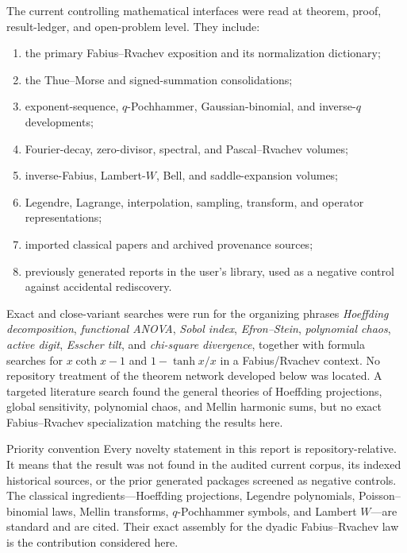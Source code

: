 \documentclass[11pt,oneside]{article}
\theoremstyle{definition}
\theoremstyle{remark}
\begin{document}
The current controlling mathematical interfaces were read at theorem,
proof, result-ledger, and open-problem level.  They include:
\begin{enumerate}
\item the primary Fabius--Rvachev exposition and its normalization dictionary;
\item the Thue--Morse and signed-summation consolidations;
\item exponent-sequence, $q$-Pochhammer, Gaussian-binomial, and inverse-$q$
      developments;
\item Fourier-decay, zero-divisor, spectral, and Pascal--Rvachev volumes;
\item inverse-Fabius, Lambert-$W$, Bell, and saddle-expansion volumes;
\item Legendre, Lagrange, interpolation, sampling, transform, and operator
      representations;
\item imported classical papers and archived provenance sources;
\item previously generated reports in the user's library, used as a negative
      control against accidental rediscovery.
\end{enumerate}

Exact and close-variant searches were run for the organizing phrases
\emph{Hoeffding decomposition}, \emph{functional ANOVA}, \emph{Sobol index},
\emph{Efron--Stein}, \emph{polynomial chaos}, \emph{active digit},
\emph{Esscher tilt}, and \emph{chi-square divergence}, together with formula
searches for $x\coth x-1$ and $1-\tanh x/x$ in a Fabius/Rvachev context.  No
repository treatment of the theorem network developed below was located.
A targeted literature search found the general theories of Hoeffding
projections, global sensitivity, polynomial chaos, and Mellin harmonic sums,
but no exact Fabius--Rvachev specialization matching the results here.

\begin{boundarybox}{Priority convention}
Every novelty statement in this report is repository-relative.  It means that
the result was not found in the audited current corpus, its indexed historical
sources, or the prior generated packages screened as negative controls.  The
classical ingredients---Hoeffding projections, Legendre polynomials,
Poisson--binomial laws, Mellin transforms, $q$-Pochhammer symbols, and Lambert
$W$---are standard and are cited.  Their exact assembly for the dyadic
Fabius--Rvachev law is the contribution considered here.
\end{boundarybox}
\end{document}
